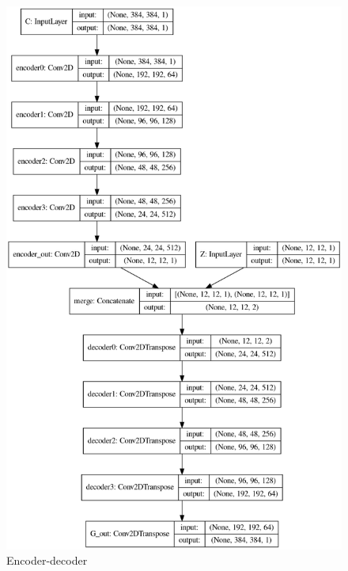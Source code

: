 \documentclass{article}
\begin{document}
	
		\begin{figure}
			\centering
			\includegraphics[scale=0.45]{encoder_decoder.png}
			\caption{Encoder-decoder}
		\end{figure}
	
\end{document}
